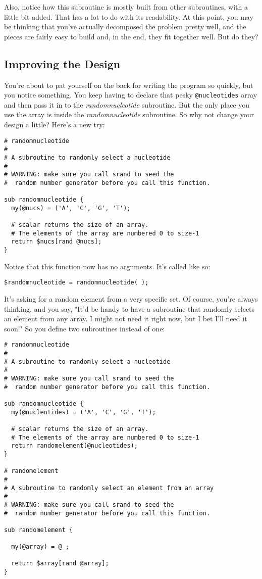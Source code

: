 Also, notice how this subroutine is mostly built from other subroutines, with a little bit added. That has a lot to do with its readability. At this point, you may be thinking that you've actually decomposed the problem pretty well, and the pieces are fairly easy to build and, in the end, they fit together well. But do they? 

\subsection{Improving the Design}
You're about to pat yourself on the back for writing the program so quickly, but you notice something. You keep having to declare that pesky \verb|@nucleotides| array and then pass it in to the \textit{randomnucleotide} subroutine. But the only place you use the array is inside the \textit{randomnucleotide} subroutine. So why not change your design a little? Here's a new try: 

\begin{lstlisting}
# randomnucleotide
#
# A subroutine to randomly select a nucleotide
#
# WARNING: make sure you call srand to seed the
#  random number generator before you call this function.

sub randomnucleotide {
  my(@nucs) = ('A', 'C', 'G', 'T');

  # scalar returns the size of an array. 
  # The elements of the array are numbered 0 to size-1
  return $nucs[rand @nucs];
}
\end{lstlisting}

Notice that this function now has no arguments. It's called like so:

\begin{lstlisting}
$randomnucleotide = randomnucleotide( );
\end{lstlisting}

It's asking for a random element from a very specific set. Of course, you're always thinking, and you say, "It'd be handy to have a subroutine that randomly selects an element from any array. I might not need it right now, but I bet I'll need it soon!" So you define two subroutines instead of one: 

\begin{lstlisting}
# randomnucleotide
#
# A subroutine to randomly select a nucleotide
#
# WARNING: make sure you call srand to seed the
#  random number generator before you call this function.

sub randomnucleotide {
  my(@nucleotides) = ('A', 'C', 'G', 'T');

  # scalar returns the size of an array. 
  # The elements of the array are numbered 0 to size-1
  return randomelement(@nucleotides);
}

# randomelement
#
# A subroutine to randomly select an element from an array
#
# WARNING: make sure you call srand to seed the
#  random number generator before you call this function.

sub randomelement {

  my(@array) = @_;

  return $array[rand @array];
}
\end{lstlisting}

